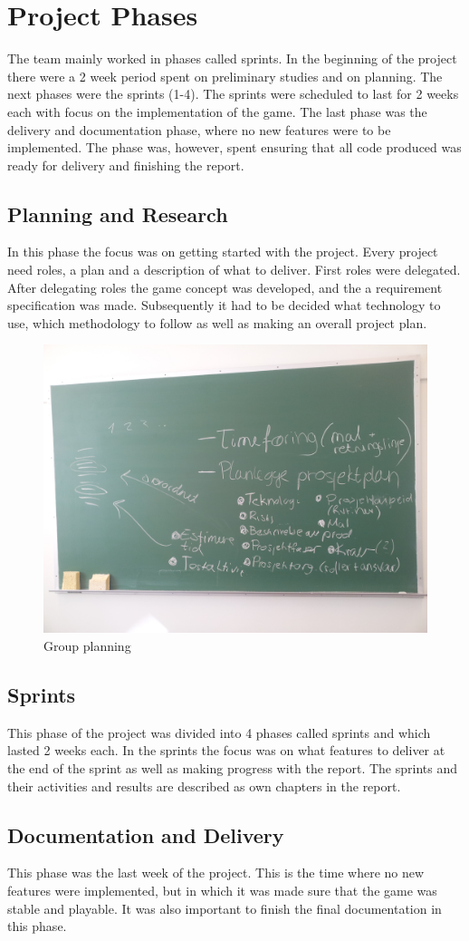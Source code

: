 \clearpage
\section{Project Phases}

The team mainly worked in phases called sprints. In the beginning of the project there were a 2 week period spent on preliminary studies and on planning. The next phases were the sprints (1-4). The sprints were scheduled to last for 2 weeks each with focus on the implementation of the game. The last phase was the delivery and documentation phase, where no new features were to be implemented. The phase was, however, spent ensuring that all code produced was ready for delivery and finishing the report.

\subsection{Planning and Research}
In this phase the focus was on getting started with the project. Every project need roles, a plan and a description of what to deliver. First roles were delegated. After delegating roles the game concept was developed, and the a requirement specification was made. Subsequently it had to be decided what technology to use, which methodology to follow as well as making an overall project plan. 

	\begin{figure}[H]
		\includegraphics[scale=0.10]{pictures/projectPlanning.jpg}
		\caption{Group planning}
	\end{figure}

\subsection{Sprints}
This phase of the project was divided into 4 phases called sprints and which lasted 2 weeks each. In the sprints the focus was on what features to deliver at the end of the sprint as well as making progress with the report. The sprints and their activities and results are described as own chapters in the report.

\subsection{Documentation and Delivery}
This phase was the last week of the project. This is the time where no new features were implemented, but in which it was  made sure that the game was stable and playable. It was also important to finish the final documentation in this phase.
